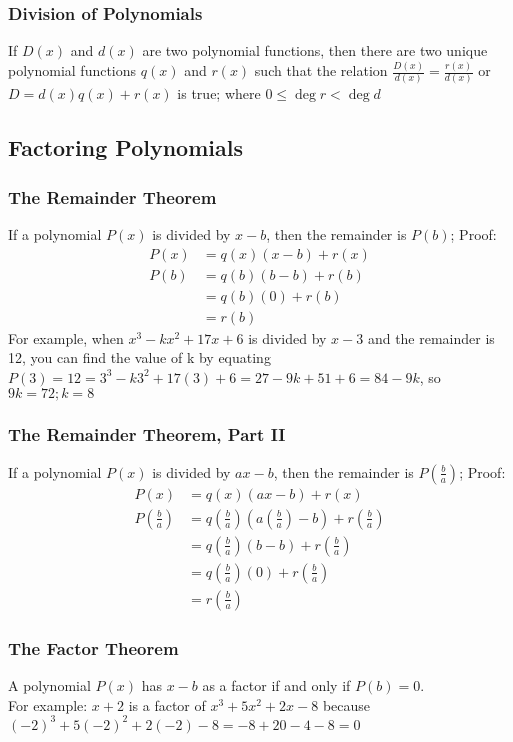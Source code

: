 \documentclass{article}
\begin{document}
	\subsubsection{Division of Polynomials}
	If $D(x)$ and $d(x)$ are two polynomial functions, then there are two unique polynomial functions $q(x)$ and $r(x)$ such that the relation $\frac{D(x)}{d(x)}=\frac{r(x)}{d(x)}$ or $D=d(x)q(x)+r(x)$ is true; where $0\leq\deg r<\deg d$
	\subsection{Factoring Polynomials}
	\subsubsection{The Remainder Theorem}
	If a polynomial $P(x)$ is divided by $x-b$, then the remainder is $P(b)$; Proof:
	\begin{align*}
		P(x)&=q(x)(x-b)+r(x)\\
		P(b)&=q(b)(b-b)+r(b)\\
		&=q(b)(0)+r(b)\\
		&=r(b)
	\end{align*}
	For example, when $x^3-kx^2+17x+6$ is divided by $x-3$ and the remainder is 12, you can find the value of k by equating $P(3)=12=3^3-k3^2+17(3)+6=27-9k+51+6=84-9k$, so $9k=72; k=8$
	\subsubsection{The Remainder Theorem, Part II}
	If a polynomial $P(x)$ is divided by $ax-b$, then the remainder is $P(\frac{b}{a})$; Proof:
	\begin{align*}
		P(x)&=q(x)(ax-b)+r(x)\\
		P\left(\frac{b}{a}\right)&=q\left(\frac{b}{a}\right)\left(a\left(\frac{b}{a}\right)-b\right)+r\left(\frac{b}{a}\right)\\
		&=q\left(\frac{b}{a}\right)\left(b-b\right)+r\left(\frac{b}{a}\right)\\
		&=q\left(\frac{b}{a}\right)\left(0\right)+r\left(\frac{b}{a}\right)\\
		&=r\left(\frac{b}{a}\right)
	\end{align*}
	\subsubsection{The Factor Theorem}
	A polynomial $P(x)$ has $x-b$ as a factor if and only if $P(b)=0$.\\
	For example: $x+2$ is a factor of $x^3+5x^2+2x-8$ because $(-2)^3+5(-2)^2+2(-2)-8=-8+20-4-8=0$\\
\end{document}
